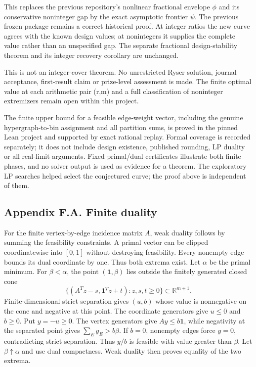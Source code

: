 \documentclass[
  11pt,
]{article}
\begin{document}
This replaces the previous repository's nonlinear fractional envelope
\(\phi\) and its conservative noninteger gap by the exact asymptotic
frontier \(\psi\). The previous frozen package remains a correct
historical proof. At integer ratios the new curve agrees with the known
design values; at nonintegers it supplies the complete value rather than
an unspecified gap. The separate fractional design-stability theorem and
its integer recovery corollary are unchanged.

This is not an integer-cover theorem. No unrestricted Ryser solution,
journal acceptance, first-result claim or prize-level assessment is
made. The finite optimal value at each arithmetic pair (r,m) and a full
classification of noninteger extremizers remain open within this
project.

The finite upper bound for a feasible edge-weight vector, including the
genuine hypergraph-to-bin assignment and all partition sums, is proved
in the pinned Lean project and supported by exact rational replay.
Formal coverage is recorded separately; it does not include design
existence, published rounding, LP duality or all real-limit arguments.
Fixed primal/dual certificates illustrate both finite phases, and no
solver output is used as evidence for a theorem. The exploratory LP
searches helped select the conjectured curve; the proof above is
independent of them.

\subsection{Appendix F.A. Finite
duality}\label{appendix-f.a.-finite-duality}

For the finite vertex-by-edge incidence matrix \(A\), weak duality
follows by summing the feasibility constraints. A primal vector can be
clipped coordinatewise into \([0,1]\) without destroying feasibility.
Every nonempty edge bounds its dual coordinate by one. Thus both extrema
exist. Let \(\alpha\) be the primal minimum. For \(\beta<\alpha\), the
point \((\mathbf1,\beta)\) lies outside the finitely generated closed
cone \[
 \{(A^Tz-s,\mathbf1^Tz+t):z,s,t\ge0\}\subset\mathbb R^{m+1}.
\] Finite-dimensional strict separation gives \((u,b)\) whose value is
nonnegative on the cone and negative at this point. The coordinate
generators give \(u\le0\) and \(b\ge0\). Put \(y=-u\ge0\). The vertex
generators give \(Ay\le b\mathbf1\), while negativity at the separated
point gives \(\sum_Ey_E>b\beta\). If \(b=0\), nonempty edges force
\(y=0\), contradicting strict separation. Thus \(y/b\) is feasible with
value greater than \(\beta\). Let \(\beta\uparrow\alpha\) and use dual
compactness. Weak duality then proves equality of the two extrema.
\end{document}
